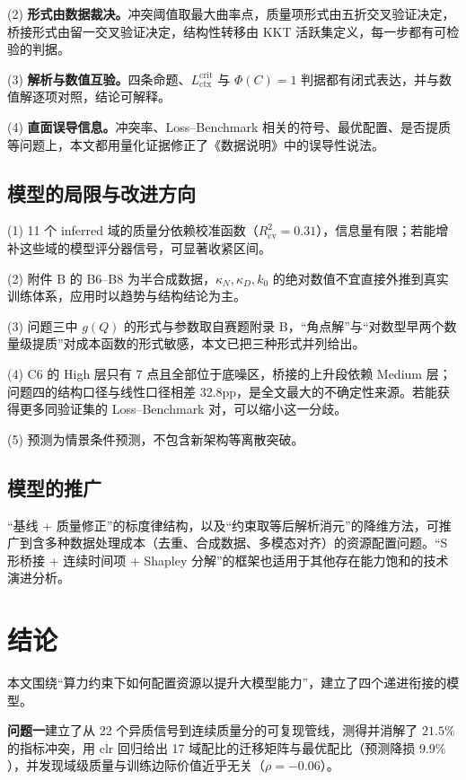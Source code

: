 (2) \textbf{形式由数据裁决。}冲突阈值取最大曲率点，质量项形式由五折交叉验证决定，桥接形式由留一交叉验证决定，结构性转移由 KKT 活跃集定义，每一步都有可检验的判据。

(3) \textbf{解析与数值互验。}四条命题、$L_{\mathrm{ctx}}^{\mathrm{crit}}$ 与 $\Phi(C)=1$ 判据都有闭式表达，并与数值解逐项对照，结论可解释。

(4) \textbf{直面误导信息。}冲突率、Loss–Benchmark 相关的符号、最优配置、是否提质等问题上，本文都用量化证据修正了《数据说明》中的误导性说法。

\subsection{模型的局限与改进方向}

(1) 11 个 inferred 域的质量分依赖校准函数（$R^2_{\mathrm{cv}}=0.31$），信息量有限；若能增补这些域的模型评分器信号，可显著收紧区间。

(2) 附件 B 的 B6–B8 为半合成数据，$\kappa_N,\kappa_D,k_0$ 的绝对数值不宜直接外推到真实训练体系，应用时以趋势与结构结论为主。

(3) 问题三中 $g(Q)$ 的形式与参数取自赛题附录 B，“角点解”与“对数型早两个数量级提质”对成本函数的形式敏感，本文已把三种形式并列给出。

(4) C6 的 High 层只有 7 点且全部位于底噪区，桥接的上升段依赖 Medium 层；问题四的结构口径与线性口径相差 32.8pp，是全文最大的不确定性来源。若能获得更多同验证集的 Loss–Benchmark 对，可以缩小这一分歧。

(5) 预测为情景条件预测，不包含新架构等离散突破。

\subsection{模型的推广}

“基线 + 质量修正”的标度律结构，以及“约束取等后解析消元”的降维方法，可推广到含多种数据处理成本（去重、合成数据、多模态对齐）的资源配置问题。“S 形桥接 + 连续时间项 + Shapley 分解”的框架也适用于其他存在能力饱和的技术演进分析。

\section{结论}

本文围绕“算力约束下如何配置资源以提升大模型能力”，建立了四个递进衔接的模型。

\textbf{问题一}建立了从 22 个异质信号到连续质量分的可复现管线，测得并消解了 $21.5\%$ 的指标冲突，用 clr 回归给出 17 域配比的迁移矩阵与最优配比（预测降损 $9.9\%$），并发现域级质量与训练边际价值近乎无关（$\rho=-0.06$）。

